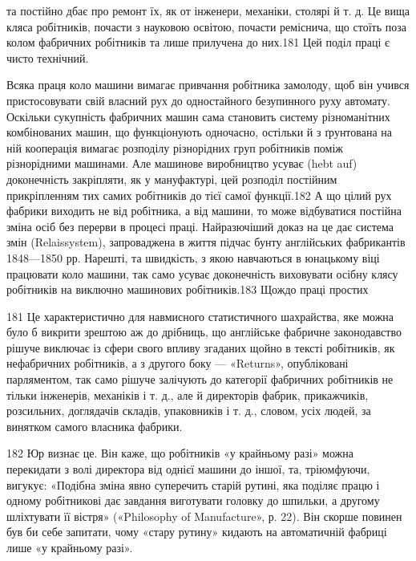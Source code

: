 та постійно дбає про ремонт їх, як от інженери, механіки, столярі
й т. д. Це вища кляса робітників, почасти з науковою освітою,
почасти реміснича, що стоїть поза колом фабричних робітників
та лише прилучена до них.181 Цей поділ праці є чисто технічний.

Всяка праця коло машини вимагає привчання робітника
замолоду, щоб він учився пристосовувати свій власний рух до
одностайного безупинного руху автомату. Оскільки сукупність
фабричних машин сама становить систему різноманітних комбінованих
машин, що функціонують одночасно, остільки й з ґрунтована
на ній кооперація вимагає розподілу різнорідних груп
робітників поміж різнорідними машинами. Але машинове виробництво
усуває (hebt auf) доконечність закріпляти, як у мануфактурі,
цей розподіл постійним прикріпленням тих самих робітників
до тієї самої функції.182 А що цілий рух фабрики виходить не від
робітника, а від машини, то може відбуватися постійна зміна
осіб без перерви в процесі праці. Найразючіший доказ на це дає
система змін (Relaissystem), запроваджена в життя підчас бунту
англійських фабрикантів 1848—1850 рр. Нарешті, та швидкість,
з якою навчаються в юнацькому віці працювати коло машини,
так само усуває доконечність виховувати осібну клясу робітників
на виключно машинових робітників.183 Щождо праці простих

181    Це характеристично для навмисного статистичного шахрайства,
яке можна було б викрити зрештою аж до дрібниць, що англійське фабричне
законодавство рішуче виключає із сфери свого впливу згаданих щойно
в тексті робітників, як нефабричних робітників, а з другого боку —
«Returns», опубліковані парляментом, так само рішуче залічують до
категорії фабричних робітників не тільки інженерів, механіків і т. д.,
але й директорів фабрик, прикажчиків, розсильних, доглядачів складів,
упаковників і т. д., словом, усіх людей, за винятком самого власника
фабрики.

182    Юр визнає це. Він каже, що робітників «у крайньому разі» можна
перекидати з волі директора від однієї машини до іншої, та, тріюмфуючи,
вигукує: «Подібна зміна явно суперечить старій рутині, яка поділяє
працю і одному робітникові дає завдання виготувати головку до шпильки,
а другому шліхтувати її вістря» («Philosophy of Manufacture», р. 22).
Він скорше повинен був би себе запитати, чому «стару рутину» кидають
на автоматичній фабриці лише «у крайньому разі».

